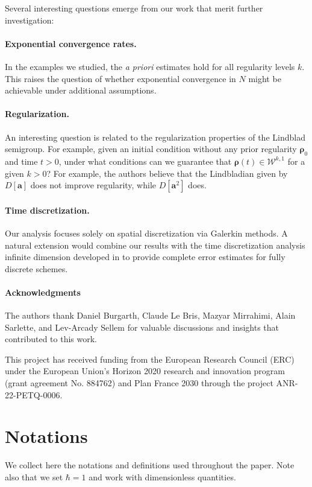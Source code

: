 \documentclass{article}
\newcommand{\xW}{\mathcal{W}}
\let\bf\boldsymbol
\newcommand{\orho}{{\bf \rho}}
\newcommand{\oa}{{\bf a}}
\begin{document}
Several interesting questions emerge from our work that merit further investigation:

\paragraph{Exponential convergence rates.} In the examples we studied, the \textit{a priori} estimates hold for all regularity levels $k$. This raises the question of whether exponential convergence in $N$ might be achievable under additional assumptions.

\paragraph{Regularization.} An interesting question is related to the regularization properties of the Lindblad semigroup. For example, given an initial condition without any prior regularity $\orho_0$ and time $t > 0$, under what conditions can we guarantee that $\orho(t) \in \xW^{k,1}$ for a given $k > 0$? For example, the authors believe that the Lindbladian given by $D[\oa]$ does not improve regularity, while $D[\oa^2]$ does. 

\paragraph{Time discretization.} Our analysis focuses solely on spatial discretization via Galerkin methods. A natural extension would combine our results with the time discretization analysis infinite dimension developed in \cite{robinUnconditionallyStableTime2025} to provide complete error estimates for fully discrete schemes.

\paragraph{Acknowledgments}
The authors thank Daniel Burgarth, Claude Le Bris, Mazyar Mirrahimi, Alain Sarlette, and Lev-Arcady Sellem for valuable discussions and insights that contributed to this work.

This project has received funding from the European Research Council (ERC) under the European Union’s Horizon
2020 research and innovation program (grant agreement No. 884762) and Plan France 2030 through the project ANR-22-PETQ-0006.
\appendix
\section{Notations}
\label{subsec:notations}
We collect here the notations and definitions used throughout the paper. Note also that we set $\hbar=1$ and work with dimensionless quantities.
\end{document}
